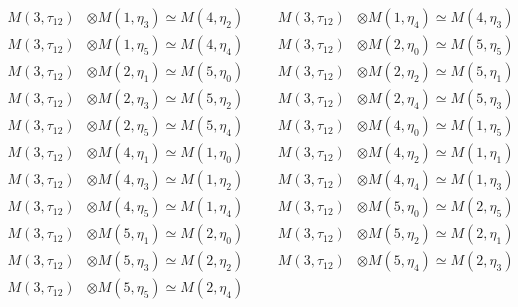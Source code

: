 \begin{align*}
M(3,\tau_{12}) &\otimes M(1,\eta_{3}) \simeq M(4,\eta_{2}) &&& M(3,\tau_{12}) &\otimes M(1,\eta_{4}) \simeq M(4,\eta_{3})\\
M(3,\tau_{12}) &\otimes M(1,\eta_{5}) \simeq M(4,\eta_{4}) &&& M(3,\tau_{12}) &\otimes M(2,\eta_{0}) \simeq M(5,\eta_{5})\\
M(3,\tau_{12}) &\otimes M(2,\eta_{1}) \simeq M(5,\eta_{0}) &&& M(3,\tau_{12}) &\otimes M(2,\eta_{2}) \simeq M(5,\eta_{1})\\
M(3,\tau_{12}) &\otimes M(2,\eta_{3}) \simeq M(5,\eta_{2}) &&& M(3,\tau_{12}) &\otimes M(2,\eta_{4}) \simeq M(5,\eta_{3})\\
M(3,\tau_{12}) &\otimes M(2,\eta_{5}) \simeq M(5,\eta_{4}) &&& M(3,\tau_{12}) &\otimes M(4,\eta_{0}) \simeq M(1,\eta_{5})\\
M(3,\tau_{12}) &\otimes M(4,\eta_{1}) \simeq M(1,\eta_{0}) &&& M(3,\tau_{12}) &\otimes M(4,\eta_{2}) \simeq M(1,\eta_{1})\\
M(3,\tau_{12}) &\otimes M(4,\eta_{3}) \simeq M(1,\eta_{2}) &&& M(3,\tau_{12}) &\otimes M(4,\eta_{4}) \simeq M(1,\eta_{3})\\
M(3,\tau_{12}) &\otimes M(4,\eta_{5}) \simeq M(1,\eta_{4}) &&& M(3,\tau_{12}) &\otimes M(5,\eta_{0}) \simeq M(2,\eta_{5})\\
M(3,\tau_{12}) &\otimes M(5,\eta_{1}) \simeq M(2,\eta_{0}) &&& M(3,\tau_{12}) &\otimes M(5,\eta_{2}) \simeq M(2,\eta_{1})\\
M(3,\tau_{12}) &\otimes M(5,\eta_{3}) \simeq M(2,\eta_{2}) &&& M(3,\tau_{12}) &\otimes M(5,\eta_{4}) \simeq M(2,\eta_{3})\\
M(3,\tau_{12}) &\otimes M(5,\eta_{5}) \simeq M(2,\eta_{4})
\end{align*}

